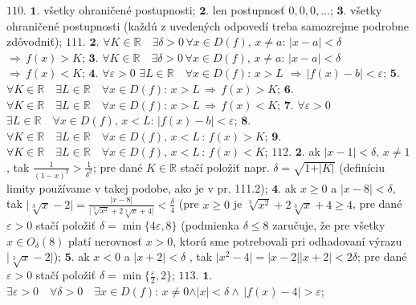$\boxed{110.}$
$\boldsymbol{1.}$
všetky ohraničené postupnosti; 
$\boldsymbol{2.}$
len postupnosť   $ 0,0,0,... $;
$\boldsymbol{3.}$
všetky  ohraničené  postupnosti (každú z uvedených odpovedí treba samozrejme podrobne zdôvodniť);
$\boxed{111.}$
$\boldsymbol{2.}$
$\forall K \in \mathbb{R} \quad \exists \delta > 0  \,  \forall x \in D(f), \, x \ne a: \, \vert x-a \vert < \delta  $  $\Rightarrow   \, f(x)  > K  $; 
$\boldsymbol{3.}$
$\forall K \in \mathbb{R} \quad \exists \delta  >0  \, \forall x \in D(f), \, x \ne a: \, \vert x-a \vert < \delta  $  $\Rightarrow   \, f(x)  < K  $;
$\boldsymbol{4.}$
$ \forall \varepsilon >0  $  $\exists L \in \mathbb{R} \quad \forall x \in D(f): \, x>L $ $\Rightarrow \, \vert f(x) - b \vert  < \varepsilon   $;
$\boldsymbol{5.}$
$ \forall K \in \mathbb{R} \quad \exists L \in \mathbb{R} \quad \forall x \in D(f): \, x>L \, \Rightarrow \, f(x)>K $;
$\boldsymbol{6.}$
$ \forall K \in \mathbb{R} \quad \exists L \in \mathbb{R} \quad \forall x \in D(f): \, x>L \, \Rightarrow \, f(x)<K $;
$\boldsymbol{7.}$
$ \forall \varepsilon >0  $  $\exists L \in \mathbb{R} \quad \forall x \in D(f), \, x<L : \, \vert f(x) - b \vert  < \varepsilon   $;
$\boldsymbol{8.}$
$ \forall K \in \mathbb{R} \quad \exists L \in \mathbb{R} \quad \forall x \in D(f), \, x<L \, : \, f(x)>K $;
$\boldsymbol{9.}$
$ \forall K \in \mathbb{R} \quad \exists L \in \mathbb{R} \quad \forall x \in D(f), \, x<L \, : \, f(x)<K $;
$\boxed{112.}$
$\boldsymbol{2.}$
ak $ \vert x-1 \vert<\delta, \, x\ne 1 $, tak  $\frac{1}{(1-x)^{2}}> \frac{1}{ \delta ^{2}}$; pre dané $ K \in \mathbb{R} $ stačí položiť napr.  $ \delta = \sqrt{1+ \vert K \vert} $ (definíciu limity používame v takej podobe, ako je v pr. 111.2);
$\boldsymbol{4.}$
ak $x\geq 0 $ a $\vert x-8 \vert < \delta $, tak $\vert \sqrt[3]{x}-2\vert = \frac{\vert x-8 \vert}{\vert \sqrt[3]{x^{2}}+2 \sqrt[3]{x}+4 \vert}< \frac{\delta}{4}  $ (pre $x\geq 0  $ je $ \sqrt[3]{x^{2}}+2 \sqrt[3]{x}+4 \geq 4 $, pre dané $\varepsilon > 0  $ stačí položiť  $\delta = \min \lbrace 4 \varepsilon, 8 \rbrace   $ (podmienka  $\delta \leq 8 $ zaručuje, že pre všetky  $x \in O_{\delta}(8) $ platí nerovnosť  $  x > 0$, ktorú sme potrebovali pri odhadovaní výrazu $ \vert \sqrt[3]{x}-2 \vert $);
$\boldsymbol{5.}$
ak $ x<0 $ a $\vert x+2\vert< \delta $ , tak  $ \vert x^{2}-4 \vert = \vert x-2 \vert \vert x+2 \vert  <2 \delta $; pre dané $\varepsilon > 0$ stačí položiť  $\delta= \min \lbrace \frac{\varepsilon}{2},2 \rbrace $;
$\boxed{113.}$
$\boldsymbol{1.}$
$\exists \varepsilon  > 0 \quad \forall \delta > 0 \quad \exists x \in D(f): \, x \ne 0 \land \vert x \vert < \delta \land \, \vert f(x)-4 \vert > \varepsilon $;

